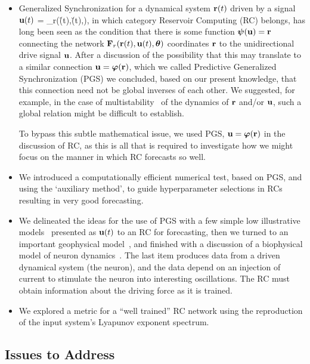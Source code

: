 \documentclass[12pt]{article}
\begin{document}
\begin{itemize}
\item Generalized Synchronization for a dynamical system $\mbox{{\bf r}}(t)$ driven by a signal $\mbox{$\bf{u}$}(t)$
\be
{} = \F_r(\r(t),\u(t),\btheta),
\ee
in which category Reservoir Computing (RC) belongs, has long been seen as the condition that there is some function $\mbox{$\boldsymbol{\psi}$}(\mbox{$\bf{u}$}) = \mbox{{\bf r}}$ connecting the network $\mbox{$\bf{F}$}_r(\mbox{{\bf r}}(t),\mbox{$\bf{u}$}(t),\mbox{$\boldsymbol{\theta}$})$ coordinates $\mbox{{\bf r}}$ to the unidirectional drive signal $\mbox{$\bf{u}$}$.
After a discussion of the possibility that this may translate to a similar connection $\mbox{$\bf{u}$} = \mbox{$\boldsymbol{\varphi}$}(\mbox{{\bf r}})$, which we called Predictive Generalized Synchronization (PGS) we concluded, based on our present knowledge, that this connection need not be global inverses of each other. We suggested, for example, in the case of multistability~\cite{gelig78,mc85,efimov12} of the dynamics of $\mbox{{\bf r}}$ and/or $\mbox{$\bf{u}$}$, such a global relation might be difficult to establish.

To bypass this subtle mathematical issue, we used PGS, $\mbox{$\bf{u}$}= \mbox{$\boldsymbol{\varphi}$}(\mbox{{\bf r}})$ in the discussion of RC, as this is all that is required to investigate how we might focus on the manner in which RC forecasts so well.
\item We introduced a computationally efficient numerical test, based on PGS, and using the `auxiliary method', to guide hyperparameter selections in RCs resulting in very good forecasting.
\item We delineated the ideas for the use of PGS with a few simple low illustrative models~\cite{lor63,lor96,lorman98} presented as $\mbox{$\bf{u}$}(t)$ to an RC for forecasting, then we turned to an important geophysical model~\cite{sadourny75,pedlosky1986,vallis17}, and finished with a discussion of a biophysical model of neuron dynamics~\cite{jwu,willshaw}. The last item produces data from a driven dynamical system (the neuron), and the data depend on an injection of current to stimulate the neuron into interesting oscillations. The RC must obtain information about the driving force as it is trained.
\item We explored a metric for a ``well trained'' RC network using the reproduction of the input system's Lyapunov exponent spectrum.
\end{itemize}

\subsection{Issues to Address}
\end{document}
